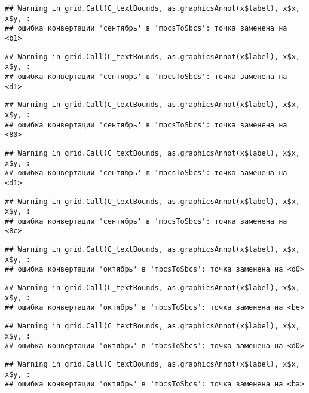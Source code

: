 \documentclass[
]{article}
\begin{document}
\begin{verbatim}
## Warning in grid.Call(C_textBounds, as.graphicsAnnot(x$label), x$x, x$y, :
## ошибка конвертации 'сентябрь' в 'mbcsToSbcs': точка заменена на <b1>
\end{verbatim}

\begin{verbatim}
## Warning in grid.Call(C_textBounds, as.graphicsAnnot(x$label), x$x, x$y, :
## ошибка конвертации 'сентябрь' в 'mbcsToSbcs': точка заменена на <d1>
\end{verbatim}

\begin{verbatim}
## Warning in grid.Call(C_textBounds, as.graphicsAnnot(x$label), x$x, x$y, :
## ошибка конвертации 'сентябрь' в 'mbcsToSbcs': точка заменена на <80>
\end{verbatim}

\begin{verbatim}
## Warning in grid.Call(C_textBounds, as.graphicsAnnot(x$label), x$x, x$y, :
## ошибка конвертации 'сентябрь' в 'mbcsToSbcs': точка заменена на <d1>
\end{verbatim}

\begin{verbatim}
## Warning in grid.Call(C_textBounds, as.graphicsAnnot(x$label), x$x, x$y, :
## ошибка конвертации 'сентябрь' в 'mbcsToSbcs': точка заменена на <8c>
\end{verbatim}

\begin{verbatim}
## Warning in grid.Call(C_textBounds, as.graphicsAnnot(x$label), x$x, x$y, :
## ошибка конвертации 'октябрь' в 'mbcsToSbcs': точка заменена на <d0>
\end{verbatim}

\begin{verbatim}
## Warning in grid.Call(C_textBounds, as.graphicsAnnot(x$label), x$x, x$y, :
## ошибка конвертации 'октябрь' в 'mbcsToSbcs': точка заменена на <be>
\end{verbatim}

\begin{verbatim}
## Warning in grid.Call(C_textBounds, as.graphicsAnnot(x$label), x$x, x$y, :
## ошибка конвертации 'октябрь' в 'mbcsToSbcs': точка заменена на <d0>
\end{verbatim}

\begin{verbatim}
## Warning in grid.Call(C_textBounds, as.graphicsAnnot(x$label), x$x, x$y, :
## ошибка конвертации 'октябрь' в 'mbcsToSbcs': точка заменена на <ba>
\end{verbatim}
\end{document}
